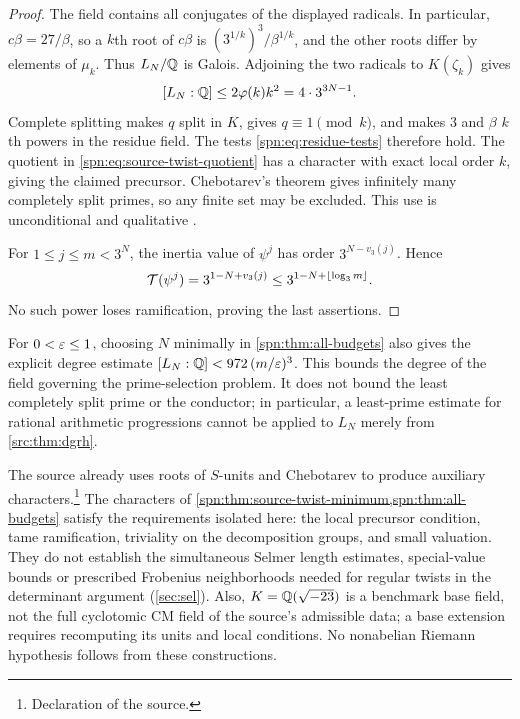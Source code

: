 \begin{proof}
The field contains all conjugates of the displayed radicals. In particular,
$c\beta=27/\beta$, so a $k$th root of $c\beta$ is
$(3^{1/k})^3/\beta^{1/k}$, and the other roots differ by elements of
$\mu_k$. Thus $L_N/\mathbb{Q}$ is Galois. Adjoining the two radicals to $K(\zeta_k)$
gives
\[
 [L_N:\mathbb{Q}]\le2\varphi(k)k^2=4\cdot3^{3N-1}.
\]
Complete splitting makes $q$ split in $K$, gives $q\equiv1\pmod k$, and makes
$3$ and $\beta$ $k$th powers in the residue field. The tests
\eqref{spn:eq:residue-tests} therefore hold. The quotient in
\eqref{spn:eq:source-twist-quotient} has a character with exact local order
$k$, giving the claimed precursor. Chebotarev's theorem gives infinitely many
completely split primes, so any finite set may be excluded. This use is
unconditional and qualitative \cite{Milne2020CFT}.

For $1\le j\le m<3^N$, the inertia value of $\psi^j$ has order
$3^{N-v_3(j)}$. Hence
\[
 \mathcal{T}(\psi^j)=3^{1-N+v_3(j)}\le3^{1-N+\lfloor\log_3m\rfloor} .
\]
No such power loses ramification, proving the last assertions.
\end{proof}

For $0<\varepsilon\le1$, choosing $N$ minimally in \cref{spn:thm:all-budgets} also
gives the explicit degree estimate $[L_N:\mathbb{Q}]<972\,(m/\varepsilon)^3$. This bounds
the degree of the field governing the prime-selection problem. It does not
bound the least completely split prime or the conductor; in particular, a
least-prime estimate for rational arithmetic progressions cannot be applied
to $L_N$ merely from \cref{src:thm:dgrh}.

\begin{remark}\label{spn:rem:twist-scope}
The source already uses roots of $S$-units and Chebotarev to produce
auxiliary characters.\footnote{Declaration
 of the source.} The
characters of \cref{spn:thm:source-twist-minimum,spn:thm:all-budgets} satisfy
the requirements isolated here: the local precursor condition, tame
ramification, triviality on the decomposition groups, and small valuation. They do not establish the simultaneous Selmer
length estimates, special-value bounds or prescribed Frobenius neighborhoods
needed for regular twists in the determinant argument (\cref{sec:sel}).
Also, $K=\mathbb{Q}(\sqrt{-23})$ is a benchmark base field, not the full cyclotomic
CM field of the source's admissible data; a base extension requires
recomputing its units and local conditions. No nonabelian Riemann hypothesis
follows from these constructions.
\end{remark}

